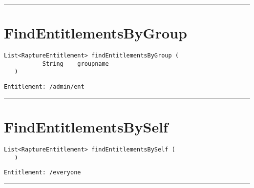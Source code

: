 \rule{12cm}{2pt}
\section{FindEntitlementsByGroup}
\label{Api:FindEntitlementsByGroup}
\begin{lstlisting}[style=nonumbers]
   List<RaptureEntitlement> findEntitlementsByGroup (
           String    groupname
   )
\end{lstlisting}
\begin{Verbatim}[formatcom=\color{Maroon}]
  Entitlement: /admin/ent
\end{Verbatim}



\rule{12cm}{2pt}
\section{FindEntitlementsBySelf}
\label{Api:FindEntitlementsBySelf}
\begin{lstlisting}[style=nonumbers]
   List<RaptureEntitlement> findEntitlementsBySelf (
   )
\end{lstlisting}
\begin{Verbatim}[formatcom=\color{Maroon}]
  Entitlement: /everyone
\end{Verbatim}



\rule{12cm}{2pt}

